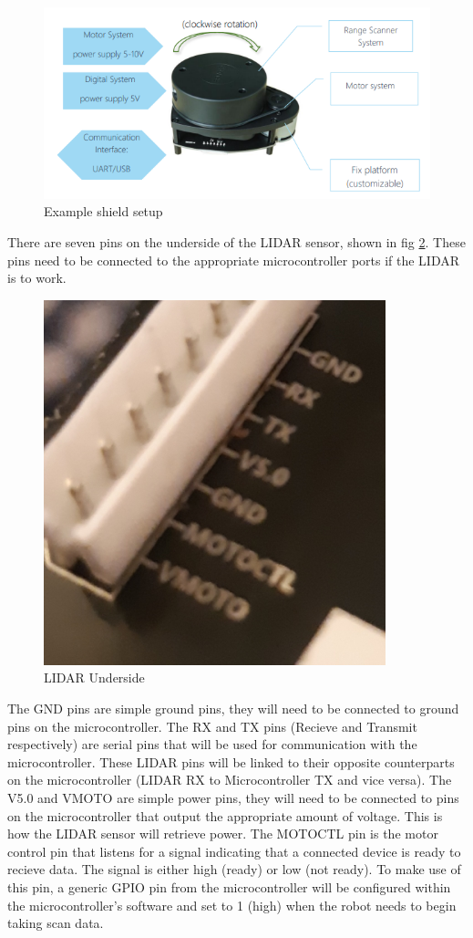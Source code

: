				\begin{figure}[h]
					\centering
					\includegraphics[width=.9\linewidth]{SYNTHESIS/rplidar_configuration.png}
					\caption{Example shield setup}
					\label{fig:rplidarconfig}
				\end{figure}
			
				There are seven pins on the underside of the LIDAR sensor, shown in fig \ref{fig:lidarunderside}. These pins need to be connected to the appropriate microcontroller ports if the LIDAR is to work. 
				\begin{figure}[h]
					\centering
					\includegraphics[width=.4\linewidth]{SYNTHESIS/lidarunderside.png}
					\caption{LIDAR Underside}
					\label{fig:lidarunderside}
				\end{figure}
				
				The GND pins are simple ground pins, they will need to be connected to ground pins on the microcontroller. The RX and TX pins (Recieve and Transmit respectively) are serial pins that will be used for communication with the microcontroller. These LIDAR pins will be linked to their opposite counterparts on the microcontroller (LIDAR RX to Microcontroller TX and vice versa). The V5.0 and VMOTO are simple power pins, they will need to be connected to pins on the microcontroller that output the appropriate amount of voltage. This is how the LIDAR sensor will retrieve power. The MOTOCTL pin is the motor control pin that listens for a signal indicating that a connected device is ready to recieve data. The signal is either high (ready) or low (not ready). To make use of this pin, a generic GPIO pin from the microcontroller will be configured within the microcontroller's software and set to 1 (high) when the robot needs to begin taking scan data.
			
